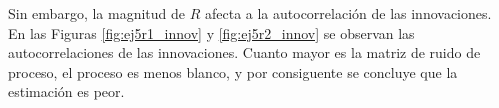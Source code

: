 	Sin embargo, la magnitud de $R$ afecta a la autocorrelación de las innovaciones. En las Figuras \ref{fig:ej5r1_innov} y \ref{fig:ej5r2_innov} se observan las autocorrelaciones de las innovaciones. Cuanto mayor es la matriz de ruido de proceso, el proceso es menos blanco, y por consiguente se concluye que la estimación es peor.


